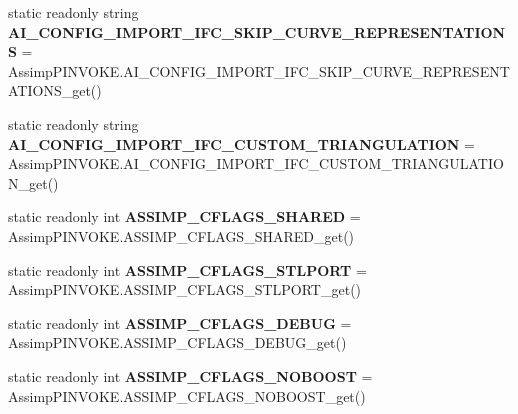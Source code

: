 \begin{DoxyCompactItemize}
\item 
\hypertarget{class_assimp_ac857d04d154cd5a40ac0edbf7df44292}{static readonly string {\bfseries A\+I\+\_\+\+C\+O\+N\+F\+I\+G\+\_\+\+I\+M\+P\+O\+R\+T\+\_\+\+I\+F\+C\+\_\+\+S\+K\+I\+P\+\_\+\+C\+U\+R\+V\+E\+\_\+\+R\+E\+P\+R\+E\+S\+E\+N\+T\+A\+T\+I\+O\+N\+S} = Assimp\+P\+I\+N\+V\+O\+K\+E.\+A\+I\+\_\+\+C\+O\+N\+F\+I\+G\+\_\+\+I\+M\+P\+O\+R\+T\+\_\+\+I\+F\+C\+\_\+\+S\+K\+I\+P\+\_\+\+C\+U\+R\+V\+E\+\_\+\+R\+E\+P\+R\+E\+S\+E\+N\+T\+A\+T\+I\+O\+N\+S\+\_\+get()}\label{class_assimp_ac857d04d154cd5a40ac0edbf7df44292}

\item 
\hypertarget{class_assimp_aabbfd067653b9ca1fbf4bb824c3f1115}{static readonly string {\bfseries A\+I\+\_\+\+C\+O\+N\+F\+I\+G\+\_\+\+I\+M\+P\+O\+R\+T\+\_\+\+I\+F\+C\+\_\+\+C\+U\+S\+T\+O\+M\+\_\+\+T\+R\+I\+A\+N\+G\+U\+L\+A\+T\+I\+O\+N} = Assimp\+P\+I\+N\+V\+O\+K\+E.\+A\+I\+\_\+\+C\+O\+N\+F\+I\+G\+\_\+\+I\+M\+P\+O\+R\+T\+\_\+\+I\+F\+C\+\_\+\+C\+U\+S\+T\+O\+M\+\_\+\+T\+R\+I\+A\+N\+G\+U\+L\+A\+T\+I\+O\+N\+\_\+get()}\label{class_assimp_aabbfd067653b9ca1fbf4bb824c3f1115}

\item 
\hypertarget{class_assimp_a783ae4d75060c5d218125bd5726c7737}{static readonly int {\bfseries A\+S\+S\+I\+M\+P\+\_\+\+C\+F\+L\+A\+G\+S\+\_\+\+S\+H\+A\+R\+E\+D} = Assimp\+P\+I\+N\+V\+O\+K\+E.\+A\+S\+S\+I\+M\+P\+\_\+\+C\+F\+L\+A\+G\+S\+\_\+\+S\+H\+A\+R\+E\+D\+\_\+get()}\label{class_assimp_a783ae4d75060c5d218125bd5726c7737}

\item 
\hypertarget{class_assimp_aedf4fbf7d1ce246645d5d06096e79830}{static readonly int {\bfseries A\+S\+S\+I\+M\+P\+\_\+\+C\+F\+L\+A\+G\+S\+\_\+\+S\+T\+L\+P\+O\+R\+T} = Assimp\+P\+I\+N\+V\+O\+K\+E.\+A\+S\+S\+I\+M\+P\+\_\+\+C\+F\+L\+A\+G\+S\+\_\+\+S\+T\+L\+P\+O\+R\+T\+\_\+get()}\label{class_assimp_aedf4fbf7d1ce246645d5d06096e79830}

\item 
\hypertarget{class_assimp_a37b5aa16e0e0320c05d4bb90ff8732fc}{static readonly int {\bfseries A\+S\+S\+I\+M\+P\+\_\+\+C\+F\+L\+A\+G\+S\+\_\+\+D\+E\+B\+U\+G} = Assimp\+P\+I\+N\+V\+O\+K\+E.\+A\+S\+S\+I\+M\+P\+\_\+\+C\+F\+L\+A\+G\+S\+\_\+\+D\+E\+B\+U\+G\+\_\+get()}\label{class_assimp_a37b5aa16e0e0320c05d4bb90ff8732fc}

\item 
\hypertarget{class_assimp_a0fceb9c36be0e5bd1f0d21063140d8f2}{static readonly int {\bfseries A\+S\+S\+I\+M\+P\+\_\+\+C\+F\+L\+A\+G\+S\+\_\+\+N\+O\+B\+O\+O\+S\+T} = Assimp\+P\+I\+N\+V\+O\+K\+E.\+A\+S\+S\+I\+M\+P\+\_\+\+C\+F\+L\+A\+G\+S\+\_\+\+N\+O\+B\+O\+O\+S\+T\+\_\+get()}\label{class_assimp_a0fceb9c36be0e5bd1f0d21063140d8f2}


\end{DoxyCompactItemize}
